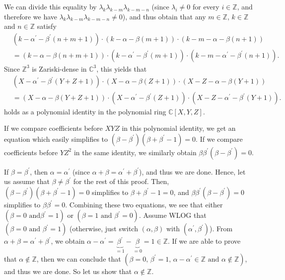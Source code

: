 \documentclass[etingof-lie.tex]{subfiles}
\begin{document}
We can divide this equality by $\lambda_{k}\lambda_{k-m}\lambda_{k-m-n}$
(since $\lambda_{i}\neq0$ for every $i\in\mathbb{Z}$, and therefore we have
$\lambda_{k}\lambda_{k-m}\lambda_{k-m-n}\neq0$), and thus obtain that any
$m\in\mathbb{Z}$, $k\in\mathbb{Z}$ and $n\in\mathbb{Z}$ satisfy
\begin{align*}
&  \left(  k-\alpha^{\prime}-\beta^{\prime}\left(  n+m+1\right)  \right)
\cdot\left(  k-\alpha-\beta\left(  m+1\right)  \right)  \cdot\left(
k-m-\alpha-\beta\left(  n+1\right)  \right) \\
&  =\left(  k-\alpha-\beta\left(  n+m+1\right)  \right)  \cdot\left(
k-\alpha^{\prime}-\beta^{\prime}\left(  m+1\right)  \right)  \cdot\left(
k-m-\alpha^{\prime}-\beta^{\prime}\left(  n+1\right)  \right)  .
\end{align*}
Since $\mathbb{Z}^{3}$ is Zariski-dense in $\mathbb{C}^{3}$, this yields that
\begin{align*}
&  \left(  X-\alpha^{\prime}-\beta^{\prime}\left(  Y+Z+1\right)  \right)
\cdot\left(  X-\alpha-\beta\left(  Z+1\right)  \right)  \cdot\left(
X-Z-\alpha-\beta\left(  Y+1\right)  \right) \\
&  =\left(  X-\alpha-\beta\left(  Y+Z+1\right)  \right)  \cdot\left(
X-\alpha^{\prime}-\beta^{\prime}\left(  Z+1\right)  \right)  \cdot\left(
X-Z-\alpha^{\prime}-\beta^{\prime}\left(  Y+1\right)  \right)  .
\end{align*}
holds as a polynomial identity in the polynomial ring $\mathbb{C}\left[
X,Y,Z\right]  $.

If we compare coefficients before $XYZ$ in this polynomial identity, we get an
equation which easily simplifies to $\left(  \beta-\beta^{\prime}\right)
\left(  \beta+\beta^{\prime}-1\right)  =0$. If we compare coefficients before
$YZ^{2}$ in the same identity, we similarly obtain $\beta\beta^{\prime}\left(
\beta-\beta^{\prime}\right)  =0$.

If $\beta=\beta^{\prime}$, then $\alpha=\alpha^{\prime}$ (since $\alpha
+\beta=\alpha^{\prime}+\beta^{\prime}$), and thus we are done. Hence, let us
assume that $\beta\neq\beta^{\prime}$ for the rest of this proof. Then,
$\left(  \beta-\beta^{\prime}\right)  \left(  \beta+\beta^{\prime}-1\right)
=0$ simplifies to $\beta+\beta^{\prime}-1=0$, and $\beta\beta^{\prime}\left(
\beta-\beta^{\prime}\right)  =0$ simplifies to $\beta\beta^{\prime}=0$.
Combining these two equations, we see that either $\left(  \beta=0\text{ and
}\beta^{\prime}=1\right)  $ or $\left(  \beta=1\text{ and }\beta^{\prime
}=0\right)  $. Assume WLOG that $\left(  \beta=0\text{ and }\beta^{\prime
}=1\right)  $ (otherwise, just switch $\left(  \alpha,\beta\right)  $ with
$\left(  \alpha^{\prime},\beta^{\prime}\right)  $). From $\alpha+\beta
=\alpha^{\prime}+\beta^{\prime}$, we obtain $\alpha-\alpha^{\prime
}=\underbrace{\beta^{\prime}}_{=1}-\underbrace{\beta}_{=0}=1\in\mathbb{Z}$. If
we are able to prove that $\alpha\notin\mathbb{Z}$, then we can conclude that
$\left(  \beta=0\text{, }\beta^{\prime}=1\text{, }\alpha-\alpha^{\prime}%
\in\mathbb{Z}\text{ and }\alpha\notin\mathbb{Z}\right)  $, and thus we are
done. So let us show that $\alpha\notin\mathbb{Z}$.
\end{document}
